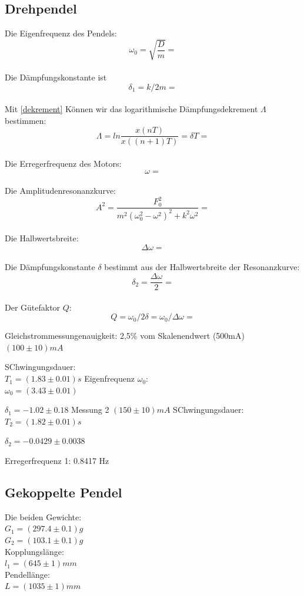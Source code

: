 \documentclass{article}
\begin{document}
\subsection{Drehpendel}
Die Eigenfrequenz des Pendels:
$$\omega_0=\sqrt{\frac{D}{m}}=$$
\\
Die Dämpfungskonstante ist
$$\delta_1=k/2m=$$
\\
Mit \ref{dekrement} Können wir das logarithmische Dämpfungsdekrement $\Lambda$ bestimmen:
$$\Lambda=ln\frac{x(nT)}{x((n+1)T)}=\delta T=$$
\\
Die Erregerfrequenz des Motors:
$$\omega=$$
\\
Die Amplitudenresonanzkurve:
$$A^2=\frac{F_0^2}{m^2(\omega_0^2-\omega^2)^2+k^2\omega^2}=$$
\\
Die Halbwertsbreite:
$$\Delta \omega=$$
\\
Die Dämpfungskonstante $\delta$ bestimmt aus der Halbwertsbreite der Resonanzkurve:
$$\delta_2=\frac{\Delta \omega}{2}=$$
\\
Der Gütefaktor $Q$:
$$Q=\omega_0/2\delta=\omega_0/\Delta \omega=$$

Gleichstrommessungenauigkeit: 2,5\% vom Skalenendwert (500mA)\\
$(100\pm 10) \si{mA}$

SChwingungsdauer:\\
$T_1=(1.83 \pm 0.01)\si{s}$
Eigenfrequenz $\omega_0$:\\
$\omega_0=(3.43 \pm 0.01)$

$\delta_1=-1.02 \pm 0.18$
Messung 2
$(150\pm10) \si{mA}$
SChwingungsdauer:\\
$T_2=(1.82 \pm 0.01)\si{s}$

$\delta_2= -0.0429 \pm 0.0038$

Erregerfrequenz 1: 0.8417 Hz

\subsection{Gekoppelte Pendel}

Die beiden Gewichte:\\
$G_1=(297.4 \pm 0.1)\si{g}$\\
$G_2=(103.1 \pm 0.1)\si{g}$\\
Kopplungslänge:\\
$l_1=(645 \pm 1)\si{mm}$\\
Pendellänge:\\
$L=(1035 \pm 1)\si{mm}$\\
\\
\end{document}
